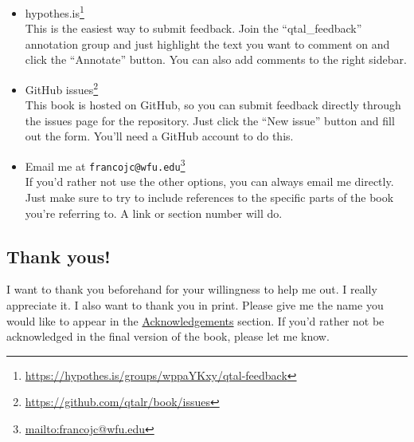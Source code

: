 \documentclass[
  letterpaper,
  DIV=11,
  numbers=noendperiod]{scrreport}
\theoremstyle{definition}
\theoremstyle{remark}
\DeclareRobustCommand{\href}[2]{#2\footnote{\url{#1}}}
\begin{document}
\begin{itemize}
\item
  \href{https://hypothes.is/groups/wppaYKxy/qtal-feedback}{hypothes.is}\\
  This is the easiest way to submit feedback. Join the
  ``qtal\_feedback'' annotation group and just highlight the text you
  want to comment on and click the ``Annotate'' button. You can also add
  comments to the right sidebar.
\item
  \href{https://github.com/qtalr/book/issues}{GitHub issues}\\
  This book is hosted on GitHub, so you can submit feedback directly
  through the issues page for the repository. Just click the ``New
  issue'' button and fill out the form. You'll need a GitHub account to
  do this.
\item
  Email me at
  \href{mailto:francojc@wfu.edu}{\nolinkurl{francojc@wfu.edu}}\\
  If you'd rather not use the other options, you can always email me
  directly. Just make sure to try to include references to the specific
  parts of the book you're referring to. A link or section number will
  do.
\end{itemize}

\hypertarget{thank-yous}{%
\subsection*{Thank yous!}\label{thank-yous}}

I want to thank you beforehand for your willingness to help me out. I
really appreciate it. I also want to thank you in print. Please give me
the name you would like to appear in the
\protect\hyperlink{acknowledgements}{Acknowledgements} section. If you'd
rather not be acknowledged in the final version of the book, please let
me know.



\printindex
\end{document}
